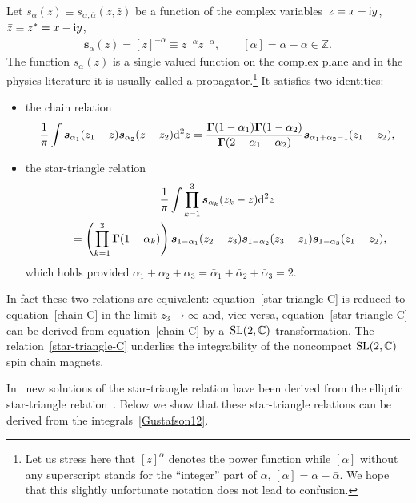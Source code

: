 \documentclass[pdftex]{sigma}
\numberwithin{equation}{section}
\begin{document}
Let $s_{\alpha}(z)\equiv s_{\alpha ,\bar\alpha}(z,\bar z)$ be a function of the complex variables~$z=x+{\rm i}y$, $\bar z\equiv z^*=x-{\rm i}y$,
\begin{gather*}
\boldsymbol s_\alpha(z) = [z]^{-\alpha}\equiv z^{-\alpha} \bar z^{-\bar\alpha}, \qquad [\alpha]=\alpha-\bar\alpha \in \mathbb Z.
\end{gather*}
The function $s_\alpha(z)$ is a single valued function on the complex plane and in the physics literature it is usually called a propagator.\footnote{Let us stress here that $[z]^\alpha$ denotes the power function while $[\alpha]$ without any superscript stands for the ``integer'' part of $\alpha$, $[\alpha]=\alpha-\bar\alpha$. We hope that this
slightly unfortunate notation does not lead to confusion.} It satisfies two identities:
\begin{itemize}\itemsep=0pt
\item the chain relation
\begin{gather}\label{chain-C}
\frac1\pi\int \boldsymbol
s_{\alpha_1} (z_1-z) \boldsymbol s_{\alpha_2}(z-z_2) {\rm d}^2 z =
\frac{\boldsymbol \Gamma(1-\alpha_1)\boldsymbol \Gamma(1-\alpha_2)}{\boldsymbol \Gamma(2-\alpha_1-\alpha_2)} \boldsymbol s_{\alpha_1+\alpha_2-1}(z_1-z_2),
\end{gather}
\item the star-triangle relation
\begin{gather}
\frac1\pi\int\prod_{k=1}^3 \boldsymbol s_{\alpha_k}(z_k-z) {\rm d}^2z \nonumber\\
\qquad{} =\left(\prod_{k=1}^3 \boldsymbol \Gamma(1-\alpha_k)\right)
\boldsymbol s_{1-\alpha_1}(z_2-z_3)\boldsymbol s_{1-\alpha_2}(z_3-z_1)\boldsymbol s_{1-\alpha_3}(z_1-z_2), \label{star-triangle-C}
\end{gather}
which holds provided $\alpha_1+\alpha_2+\alpha_3=\bar \alpha_1+\bar \alpha_2+\bar \alpha_3=2$.
\end{itemize}
In fact these two relations are equivalent: equation~\eqref{star-triangle-C} is reduced to equation~\eqref{chain-C} in the limit $z_3\to \infty$ and, vice versa, equation~\eqref{star-triangle-C} can be derived from equation~\eqref{chain-C} by a~${\rm SL}(2,\mathbb C)$ transformation. The relation~\eqref{star-triangle-C} underlies the integrability of the noncompact ${\rm SL}(2,\mathbb C)$ spin chain magnets.

In~\cite{Bazhanov:2007vg,Kels:2013ola,Kels:2015bda} new solutions of the star-triangle relation have been derived from the elliptic star-triangle relation~\cite{Bazhanov:2010kz,Derkachov:2012iv,Spiridonov18,Spiridonov:2010em}. Below we show that these star-triangle relations can be derived from the integrals~\eqref{Gustafson12}.
\end{document}
